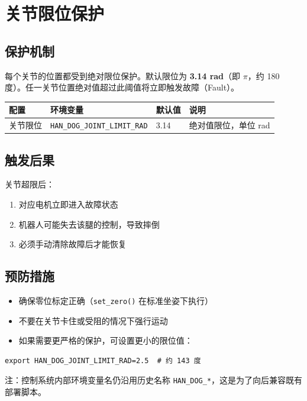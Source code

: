 \documentclass[a4paper,11pt,openany]{book}
\begin{document}
\section{关节限位保护}

\subsection{保护机制}

每个关节的位置都受到绝对限位保护。默认限位为 \textbf{3.14 rad}（即 $\pi$，约 180 度）。任一关节位置绝对值超过此阈值将立即触发故障（Fault）。

\begin{longtable}{llll}
\toprule
配置 & 环境变量 & 默认值 & 说明 \\
\midrule
\endhead
关节限位 & \texttt{HAN\_DOG\_JOINT\_LIMIT\_RAD} & 3.14 & 绝对值限位，单位 rad \\
\bottomrule
\end{longtable}

\subsection{触发后果}

关节超限后：
\begin{enumerate}[nosep]
  \item 对应电机立即进入故障状态
  \item 机器人可能失去该腿的控制，导致摔倒
  \item 必须手动清除故障后才能恢复
\end{enumerate}

\subsection{预防措施}

\begin{itemize}[nosep]
  \item 确保零位标定正确（\texttt{set\_zero()} 在标准坐姿下执行）
  \item 不要在关节卡住或受阻的情况下强行运动
  \item 如果需要更严格的保护，可设置更小的限位值：
\end{itemize}

\begin{lstlisting}[style=bash]
export HAN_DOG_JOINT_LIMIT_RAD=2.5  # 约 143 度
\end{lstlisting}

\noindent 注：控制系统内部环境变量名仍沿用历史名称 \texttt{HAN\_DOG\_*}，这是为了向后兼容既有部署脚本。
\end{document}
